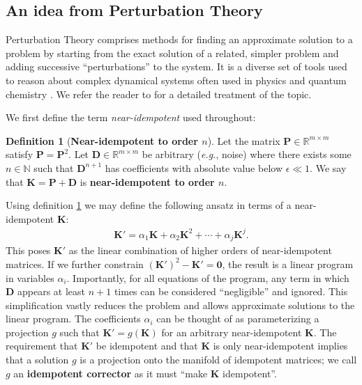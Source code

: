 \documentclass{article}
\theoremstyle{plain}
\theoremstyle{definition}
\newtheorem{definition}[theorem]{Definition}
\theoremstyle{remark}
\newcommand{\vD}{\mathbf{D}}
\newcommand{\vK}{\mathbf{K}}
\newcommand{\vP}{\mathbf{P}}
\begin{document}
\subsection{An idea from Perturbation Theory}
\label{sec:method-idea}
Perturbation Theory comprises methods for finding an approximate solution to a problem by starting from the exact solution of a related, simpler problem and adding successive ``perturbations'' to the system. It is a diverse set of tools used to reason about complex dynamical systems often used in physics and quantum chemistry \cite{hirschfelder-dev-perturb}. We refer the reader to \cite{intro-pertub-theory} for a detailed treatment of the topic.

We first define the term \textit{near-idempotent} used throughout:

\begin{definition}[\textbf{Near-idempotent to order $n$}]
    Let the matrix ${\vP \in \mathbb{R}^{m \times m}}$ satisfy ${\vP = \vP^2}$. Let ${\vD \in \mathbb{R}^{m \times m}}$ be arbitrary (\textit{e.g.}, noise) where there exists some ${n \in \mathbb{N}}$ such that $\vD^{n+1}$ has coefficients with absolute value below $\epsilon \ll 1$. We say that ${\vK = \vP + \vD}$ is \textbf{near-idempotent to order $n$}.
    \label{def:near-idem}
\end{definition}

Using definition \ref{def:near-idem} we may define the following ansatz in terms of a near-idempotent $\vK$:
%
\begin{align}
    \vK' = \alpha_1 \vK + \alpha_2 \vK^2 + \cdots + \alpha_j \vK^j.
    \label{eq:ansatz}
\end{align}
%
This poses $\vK'$ as the linear combination of higher orders of near-idempotent matrices. If we further constrain ${(\vK')^2 - \vK' = \bm{0}}$, the result is a linear program in variables $\alpha_i$. Importantly, for all equations of the program, any term in which $\vD$ appears at least $n+1$ times can be considered ``negligible'' and ignored. This simplification vastly reduces the problem and allows approximate solutions to the linear program. The coefficients $\alpha_i$ can be thought of as parameterizing a projection $g$ such that ${\vK' = g(\vK)}$ for an arbitrary near-idempotent $\vK$. The requirement that $\vK'$ be idempotent and that $\vK$ is only near-idempotent implies that a solution $g$ is a projection onto the manifold of idempotent matrices; we call $g$ an \textbf{idempotent corrector} as it must ``make $\vK$ idempotent''.
\end{document}
